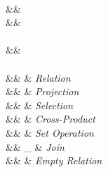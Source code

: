 \begin{figure}
\begin{syntax}

 \\[1ex]
\bullet
  &\eqq&  \\
\circ
  &\eqq& \cup \myOR \cap \\[2ex]

 \\[1ex]
\pCond\in\pCondSet
  &\eqq&   \\[2ex]


 \\[1ex]
\pQ\in\pQSet
  &\eqq&  \pRel     & \textit{Relation}\\
  &\myOR& \pPrj[\pAttList]{\pQ} & \textit{Projection}\\
  &\myOR& \pSel\pQ & \textit{Selection}\\
  &\myOR& \pQ \times \pQ & \textit{Cross-Product}\\
  &\myOR& \pQ \circ \pQ  & \textit{Set Operation}\\
 &\myOR& \pQ \Join_{\pCond} \pQ & \textit{Join}\\
  &\myOR& \empRel & \textit{Empty Relation}





\end{syntax}
\end{figure}
